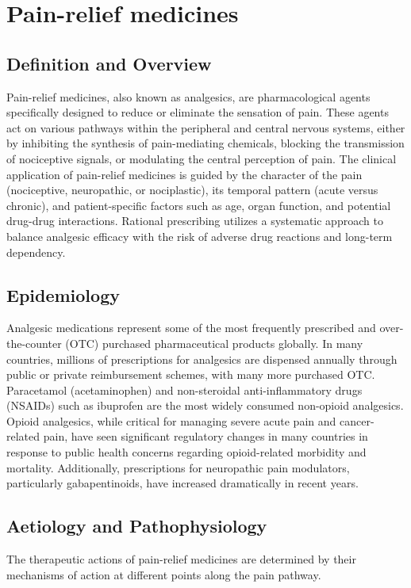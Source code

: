 \chapter{Pain-relief medicines}

\section*{Definition and Overview}
Pain-relief medicines, also known as analgesics, are pharmacological agents specifically designed to reduce or eliminate the sensation of pain. These agents act on various pathways within the peripheral and central nervous systems, either by inhibiting the synthesis of pain-mediating chemicals, blocking the transmission of nociceptive signals, or modulating the central perception of pain. The clinical application of pain-relief medicines is guided by the character of the pain (nociceptive, neuropathic, or nociplastic), its temporal pattern (acute versus chronic), and patient-specific factors such as age, organ function, and potential drug-drug interactions. Rational prescribing utilizes a systematic approach to balance analgesic efficacy with the risk of adverse drug reactions and long-term dependency.

\section*{Epidemiology}
Analgesic medications represent some of the most frequently prescribed and over-the-counter (OTC) purchased pharmaceutical products globally. In many countries, millions of prescriptions for analgesics are dispensed annually through public or private reimbursement schemes, with many more purchased OTC. Paracetamol (acetaminophen) and non-steroidal anti-inflammatory drugs (NSAIDs) such as ibuprofen are the most widely consumed non-opioid analgesics. Opioid analgesics, while critical for managing severe acute pain and cancer-related pain, have seen significant regulatory changes in many countries in response to public health concerns regarding opioid-related morbidity and mortality. Additionally, prescriptions for neuropathic pain modulators, particularly gabapentinoids, have increased dramatically in recent years.

\section*{Aetiology and Pathophysiology}
The therapeutic actions of pain-relief medicines are determined by their mechanisms of action at different points along the pain pathway.


